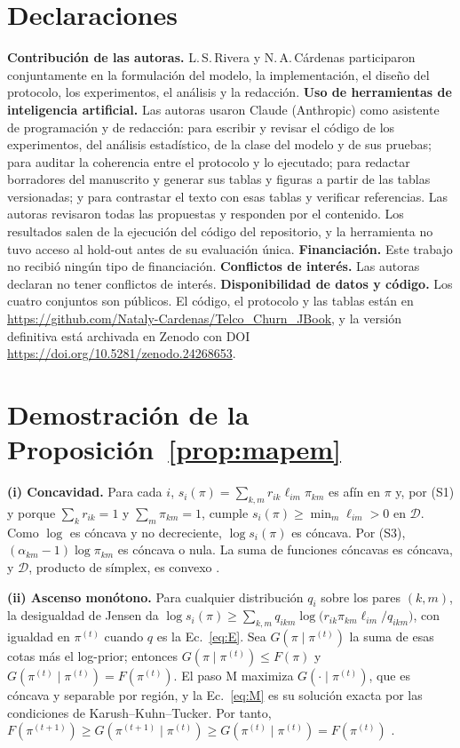 \documentclass[11pt,a4paper]{article}
\newcommand{\doi}[1]{\url{https://doi.org/#1}}
\begin{document}
\section*{Declaraciones}
\textbf{Contribución de las autoras.} L.\,S.\,Rivera y N.\,A.\,Cárdenas participaron conjuntamente en la formulación del modelo, la implementación, el diseño del protocolo, los experimentos, el análisis y la redacción. \textbf{Uso de herramientas de inteligencia artificial.} Las autoras usaron Claude (Anthropic) como asistente de programación y de redacción: para escribir y revisar el código de los experimentos, del análisis estadístico, de la clase del modelo y de sus pruebas; para auditar la coherencia entre el protocolo y lo ejecutado; para redactar borradores del manuscrito y generar sus tablas y figuras a partir de las tablas versionadas; y para contrastar el texto con esas tablas y verificar referencias. Las autoras revisaron todas las propuestas y responden por el contenido. Los resultados salen de la ejecución del código del repositorio, y la herramienta no tuvo acceso al hold-out antes de su evaluación única. \textbf{Financiación.} Este trabajo no recibió ningún tipo de financiación. \textbf{Conflictos de interés.} Las autoras declaran no tener conflictos de interés. \textbf{Disponibilidad de datos y código.} Los cuatro conjuntos son públicos. El código, el protocolo y las tablas están en \url{https://github.com/Nataly-Cardenas/Telco_Churn_JBook}, y la versión definitiva está archivada en Zenodo con DOI \doi{10.5281/zenodo.24268653}.

\appendix
\section{Demostración de la Proposición~\ref{prop:mapem}}\label{app:prueba}

\textbf{(i) Concavidad.} Para cada $i$, $s_i(\pi)=\sum_{k,m}r_{ik}\ell_{im}\pi_{km}$ es afín en $\pi$ y, por (S1) y porque $\sum_k r_{ik}=1$ y $\sum_m\pi_{km}=1$, cumple $s_i(\pi)\ge\min_m\ell_{im}>0$ en $\mathcal D$. Como $\log$ es cóncava y no decreciente, $\log s_i(\pi)$ es cóncava. Por (S3), $(\alpha_{km}-1)\log\pi_{km}$ es cóncava o nula. La suma de funciones cóncavas es cóncava, y $\mathcal D$, producto de símplex, es convexo \cite{boyd2004}.

\textbf{(ii) Ascenso monótono.} Para cualquier distribución $q_i$ sobre los pares $(k,m)$, la desigualdad de Jensen da $\log s_i(\pi)\ge\sum_{k,m}q_{ikm}\log\big(r_{ik}\pi_{km}\ell_{im}/q_{ikm}\big)$, con igualdad en $\pi^{(t)}$ cuando $q$ es la Ec.~\eqref{eq:E}. Sea $G(\pi\mid\pi^{(t)})$ la suma de esas cotas más el log-prior; entonces $G(\pi\mid\pi^{(t)})\le F(\pi)$ y $G(\pi^{(t)}\mid\pi^{(t)})=F(\pi^{(t)})$. El paso M maximiza $G(\cdot\mid\pi^{(t)})$, que es cóncava y separable por región, y la Ec.~\eqref{eq:M} es su solución exacta por las condiciones de Karush--Kuhn--Tucker. Por tanto, $F(\pi^{(t+1)})\ge G(\pi^{(t+1)}\mid\pi^{(t)})\ge G(\pi^{(t)}\mid\pi^{(t)})=F(\pi^{(t)})$ \cite{dempster1977}.
\end{document}

